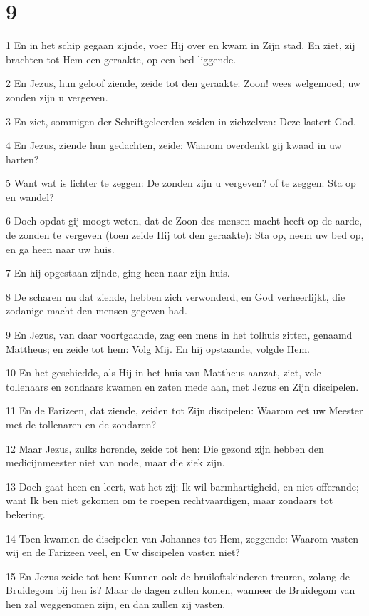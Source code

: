 \chapter{9}

\par 1 En in het schip gegaan zijnde, voer Hij over en kwam in Zijn stad. En ziet, zij brachten tot Hem een geraakte, op een bed liggende.
\par 2 En Jezus, hun geloof ziende, zeide tot den geraakte: Zoon! wees welgemoed; uw zonden zijn u vergeven.
\par 3 En ziet, sommigen der Schriftgeleerden zeiden in zichzelven: Deze lastert God.
\par 4 En Jezus, ziende hun gedachten, zeide: Waarom overdenkt gij kwaad in uw harten?
\par 5 Want wat is lichter te zeggen: De zonden zijn u vergeven? of te zeggen: Sta op en wandel?
\par 6 Doch opdat gij moogt weten, dat de Zoon des mensen macht heeft op de aarde, de zonden te vergeven (toen zeide Hij tot den geraakte): Sta op, neem uw bed op, en ga heen naar uw huis.
\par 7 En hij opgestaan zijnde, ging heen naar zijn huis.
\par 8 De scharen nu dat ziende, hebben zich verwonderd, en God verheerlijkt, die zodanige macht den mensen gegeven had.
\par 9 En Jezus, van daar voortgaande, zag een mens in het tolhuis zitten, genaamd Mattheus; en zeide tot hem: Volg Mij. En hij opstaande, volgde Hem.
\par 10 En het geschiedde, als Hij in het huis van Mattheus aanzat, ziet, vele tollenaars en zondaars kwamen en zaten mede aan, met Jezus en Zijn discipelen.
\par 11 En de Farizeen, dat ziende, zeiden tot Zijn discipelen: Waarom eet uw Meester met de tollenaren en de zondaren?
\par 12 Maar Jezus, zulks horende, zeide tot hen: Die gezond zijn hebben den medicijnmeester niet van node, maar die ziek zijn.
\par 13 Doch gaat heen en leert, wat het zij: Ik wil barmhartigheid, en niet offerande; want Ik ben niet gekomen om te roepen rechtvaardigen, maar zondaars tot bekering.
\par 14 Toen kwamen de discipelen van Johannes tot Hem, zeggende: Waarom vasten wij en de Farizeen veel, en Uw discipelen vasten niet?
\par 15 En Jezus zeide tot hen: Kunnen ook de bruiloftskinderen treuren, zolang de Bruidegom bij hen is? Maar de dagen zullen komen, wanneer de Bruidegom van hen zal weggenomen zijn, en dan zullen zij vasten.
